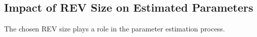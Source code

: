 \subsection{Impact of REV Size on Estimated Parameters}
The chosen REV size plays a role in the parameter estimation process. 